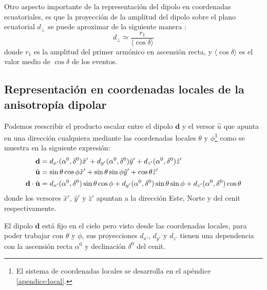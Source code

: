 Otro aspecto importante de la representación del dipolo en coordenadas ecuatoriales, es que la proyección de la amplitud del dipolo sobre el plano ecuatorial $d_\perp$ se puede aproximar de la siguiente manera \cite{taborda} :
\begin{equation}
    d_\perp \simeq \frac{r_1}{ \langle \cos\delta \rangle}
    \label{eq:fourier_perp}
\end{equation}
donde $r_1$ es la amplitud del primer armónico en ascensión recta, y $\langle \cos\delta \rangle$ es el valor medio de $\cos\delta $ de los eventos.

\subsection{Representación en coordenadas locales de la anisotropía dipolar}

Podemos reescribir el producto escalar entre el dipolo $\textbf{d}$ y el versor $\hat{u}$ que apunta en una dirección cualquiera mediante las coordenadas locales $\theta$ y $\phi$\footnote{El sistema de coordenadas locales se desarrolla en el apéndice \ref{apendice:local}.} como se muestra en la siguiente expresión: 
\begin{align}
    \textbf{d} &=  d_{x'}(\alpha^0, \delta^0)\hat{x}' +  d_{y'}(\alpha^0, \delta^0)\hat{y}'+ d_{z'}(\alpha^0, \delta^0)\hat{z}' \\
    \hat{\bf{u}} &=\sin\theta \cos\phi \hat{x}' + \sin\theta \sin\phi \hat{y}' + \cos\theta\hat{z}'\\
    \textbf{d}\cdot\hat{\bf{u}} &= d_{x'}(\alpha^0, \delta^0)\sin\theta \cos\phi
    + d_{y'}(\alpha^0, \delta^0) \sin\theta \sin\phi  
     + d_{z'}(\alpha^0, \delta^0)\cos\theta \label{eq:dot-prod-local}
\end{align}
donde los versores $\hat{x}'$, $\hat{y}'$ y $\hat{z}'$ apuntan a la dirección Este, Norte y del cenit respectivamente. 

El dipolo $\textbf{d}$ está fijo en el cielo pero visto desde las coordenadas locales, para poder trabajar con $\theta$ y $\phi$, sus proyecciones  $d_{x'}$, $d_{y'}$ y $d_{z'}$ tienen una dependencia con la ascensión recta  $\alpha^0$ y declinación $\delta^0$ del cenit. 
